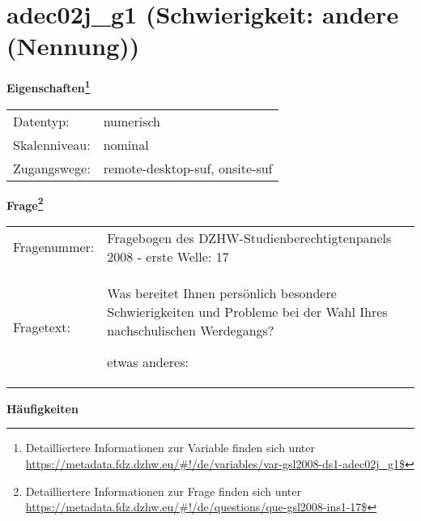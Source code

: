 
    \setcounter{footnote}{0}

    \vspace*{-1.8cm}
	\section{adec02j\_g1 (Schwierigkeit: andere (Nennung))}
	\label{section:adec02j_g1}



    \vspace*{0.5cm}
    \noindent\textbf{Eigenschaften\footnote{Detailliertere Informationen zur Variable finden sich unter
		\url{https://metadata.fdz.dzhw.eu/\#!/de/variables/var-gsl2008-ds1-adec02j_g1$}}}\\
	\begin{tabularx}{\hsize}{@{}lX}
	Datentyp: & numerisch \\
	Skalenniveau: & nominal \\
	Zugangswege: &
	  remote-desktop-suf, 
	  onsite-suf
 \\
    \end{tabularx}



				\vspace*{0.5cm}
                \noindent\textbf{Frage\footnote{Detailliertere Informationen zur Frage finden sich unter
		              \url{https://metadata.fdz.dzhw.eu/\#!/de/questions/que-gsl2008-ins1-17$}}}\\
				\begin{tabularx}{\hsize}{@{}lX}
					Fragenummer: &
					  Fragebogen des DZHW-Studienberechtigtenpanels 2008 - erste Welle:
					  17
 \\
					Fragetext: & Was bereitet Ihnen persönlich besondere Schwierigkeiten und Probleme bei der Wahl Ihres nachschulischen Werdegangs?\par  etwas anderes: \\
				\end{tabularx}





        		\vspace*{0.5cm}
                \noindent\textbf{Häufigkeiten}

